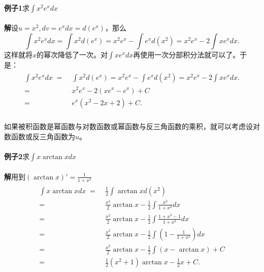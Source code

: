 \paragraph{}
\textbf{例子1\;}求$\displaystyle\int x^2e^xdx$

\paragraph{}
\textbf{解\;}设$u=x^2, dv = e^xdx = d(e^x)$，那么
\begin{equation*}
  \int x^2e^xdx = \int x^2d(e^x) = x^2e^x - \int e^xd(x^2) = x^2e^x - 2\int xe^xdx.
\end{equation*}
这样就将$x$的幂次降低了一次。对$\displaystyle\int xe^xdx$再使用一次分部积分法就可以了。于是：
\begin{align*}
\begin{split}
  \int x^2e^xdx \;=&\; \int x^2d(e^x) = x^2e^x - \int e^xd(x^2) = x^2e^x - 2\int xe^xdx. \\
  =&\; x^2e^x - 2(xe^x-e^x) + C \\
  =&\; e^x(x^2-2x+2)+C.
\end{split}
\end{align*}

\paragraph{}
如果被积函数是幂函数与对数函数或幂函数与反三角函数的乘积，就可以考虑设对数函数或反三角函数为$u$。

\paragraph{}
\textbf{例子2\;}求$\displaystyle\int x\arctan{x}dx$

\paragraph{}
\textbf{解\;}用到$\displaystyle (\arctan{x})' = \frac{1}{1+x^2}$
\begin{align*}
\begin{split}
  \int x\arctan{x}dx \;=&\; \frac{1}{2}\int \arctan{x}d(x^2) \\
  =&\; \frac{x^2}{2}\arctan{x} - \frac{1}{2}\int \frac{x^2}{1+x^2}dx \\
  =&\; \frac{x^2}{2}\arctan{x} - \frac{1}{2}\int\frac{1+x^2-1}{1+x^2}dx \\
  =&\; \frac{x^2}{2}\arctan{x} - \frac{1}{2}\int(1-\frac{1}{1+x^2})dx \\
  =&\; \frac{x^2}{2}\arctan{x} - \frac{1}{2}\int(x-\arctan{x}) + C \\
  =&\; \frac{1}{2}(x^2+1)\arctan{x} - \frac{1}{2}x + C.
\end{split}
\end{align*}
